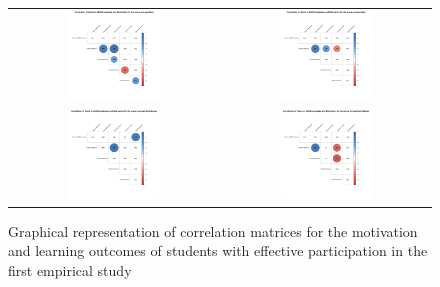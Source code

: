 \begin{figure}[htb]
 \caption{Graphical representation of correlation matrices for the motivation and learning outcomes of students with effective participation in the first empirical study}
 \label{fig:effective-correlation-matrices-first-study}
 \centering
 \begin{tabular}{cc}
 \includegraphics[width=0.45\textwidth]{images/chap-evaluation/corr-effective-first/non-gamified1.png}&
 \includegraphics[width=0.45\textwidth]{images/chap-evaluation/corr-effective-first/ont-gamified1.png}\\
 \includegraphics[width=0.45\textwidth]{images/chap-evaluation/corr-effective-first/non-gamifiedMaster1.png}&
 \includegraphics[width=0.45\textwidth]{images/chap-evaluation/corr-effective-first/ont-gamifiedMaster1.png}\\

\end{tabular}
\end{figure}
